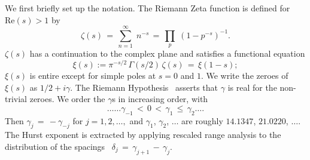 \documentclass[11pt]{article}
\begin{document}
We first briefly set up the notation.
The Riemann Zeta function is defined for $\mathrm{Re} (s) > 1$ by
\begin{equation}
\zeta ( s ) \, = \, \sum^{\infty}_{n = 1} \; n^{-s} \, = \, \prod_{p} \;
\left( 1 - p^{-s} \right)^{-1}.
\label{eqRie}
\end{equation}
$\zeta ( s )$ has a  continuation
to the complex plane and satisfies a functional equation
\begin{equation}
\xi(s):= \pi^{-s/2} \, \Gamma (s/2) \, \zeta ( s ) \, = \, \xi ( 1 - s );
\label{eq:func}
\end{equation}
$\xi(s)$ is entire except for simple poles at $s = 0$ and $1$.  We
write the zeroes of $\xi(s)$ as $1/2 + i \gamma$.
The Riemann Hypothesis~\cite{Riemann(1858),Riemann(1892),Titchmarsh(1986),Edwards(1974)}
asserts that $\gamma$ is real for the non-trivial zeroes.
We order the $\gamma$s in increasing order, with
\begin{equation}
\ldots \ldots \gamma_{-1} \, < \, 0 \, < \,
\gamma_1 \, \leq \, \gamma_2 \ldots.
\end{equation}
Then $\gamma_j \, = \, - \gamma_{-j}$ for $j = 1, 2, \ldots,$
and    $\gamma_1$, $\gamma_2$, $\ldots$  are roughly
$14.1347$, $21.0220$, $\ldots$.
The Hurst exponent is extracted by applying rescaled range analysis
to the distribution of the spacings~\cite{os6}
$\delta_j\, = \, \gamma_{j + 1} \, - \, \gamma_j$.
\end{document}
